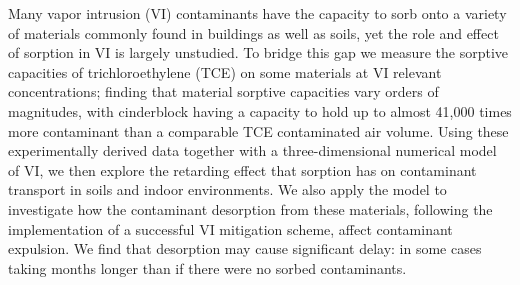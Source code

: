 Many vapor intrusion (VI) contaminants have the capacity to sorb onto a variety of materials commonly found in buildings as well as soils, yet the role and effect of sorption in VI is largely unstudied.
To bridge this gap we measure the sorptive capacities of trichloroethylene (TCE) on some materials at VI relevant concentrations; finding that material sorptive capacities vary orders of magnitudes, with cinderblock having a capacity to hold up to almost 41,000 times more contaminant than a comparable TCE contaminated air volume.
Using these experimentally derived data together with a three-dimensional numerical model of VI, we then explore the retarding effect that sorption has on contaminant transport in soils and indoor environments.
We also apply the model to investigate how the contaminant desorption from these materials, following the implementation of a successful VI mitigation scheme, affect contaminant expulsion.
We find that desorption may cause significant delay: in some cases taking months longer than if there were no sorbed contaminants.
